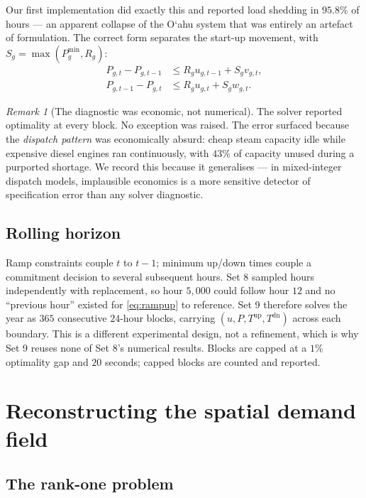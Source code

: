 \documentclass[11pt,a4paper]{article}
\theoremstyle{definition}
\theoremstyle{plain}
\theoremstyle{remark}
\newtheorem{remark}[definition]{Remark}
\newcommand{\okina}{\textquoteleft}
\newcommand{\Oahu}{O\okina ahu}
\begin{document}
Our first implementation did exactly this and reported load shedding in
$95.8\%$ of hours --- an apparent collapse of the \Oahu{} system that was
entirely an artefact of formulation. The correct form separates the start-up
movement, with $S_g = \max(P^{\min}_g, R_g)$:
\begin{align}
P_{g,t} - P_{g,t-1} &\le R_g u_{g,t-1} + S_g v_{g,t}, \label{eq:rampup}\\
P_{g,t-1} - P_{g,t} &\le R_g u_{g,t}   + S_g w_{g,t}. \label{eq:rampdn}
\end{align}

\begin{remark}[The diagnostic was economic, not numerical]
\label{rem:tell}
The solver reported optimality at every block. No exception was raised. The
error surfaced because the \emph{dispatch pattern} was economically absurd:
cheap steam capacity idle while expensive diesel engines ran continuously, with
$43\%$ of capacity unused during a purported shortage. We record this because
it generalises --- in mixed-integer dispatch models, implausible economics is a
more sensitive detector of specification error than any solver diagnostic.
\end{remark}

\subsection{Rolling horizon}

Ramp constraints couple $t$ to $t-1$; minimum up/down times couple a commitment
decision to several subsequent hours. Set 8 sampled hours independently with
replacement, so hour $5{,}000$ could follow hour $12$ and no ``previous hour''
existed for \eqref{eq:rampup} to reference. Set 9 therefore solves the year as
$365$ consecutive $24$-hour blocks, carrying $(u,P,T^{\mathrm{up}},T^{\mathrm{dn}})$
across each boundary. This is a different experimental design, not a refinement,
which is why Set 9 reuses none of Set 8's numerical results. Blocks are capped
at a $1\%$ optimality gap and $20$ seconds; capped blocks are counted and
reported.

\section{Reconstructing the spatial demand field}
\label{sec:demand}

\subsection{The rank-one problem}
\end{document}
